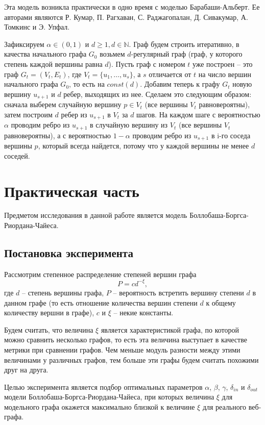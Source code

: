 \documentclass[14pt]{extreport}
\begin{document}
Эта модель возникла практически в одно время с моделью Барабаши-Альберт. Ее авторами являются Р. Кумар, П. Рагхаван, С. Раджагопалан, Д. Сивакумар, А. Томкинс и Э. Упфал.

Зафиксируем $\alpha \in (0,1)$ и $d \ge 1, d \in \mathbb{N}$. Граф будем строить итеративно, в качества начального графа $G_0$ возьмем $d$-регулярный граф (граф, у которого степень каждой вершины равна $d$). Пусть граф с номером $t$ уже построен -- это граф $G_t = (V_t, E_t)$, где $V_t = \{u_1, \dots, u_s\}$, а $s$ отличается от $t$ на число вершин начального графа $G_0$, то есть на $const(d)$. Добавим теперь к графу $G_t$ новую вершину $u_{s+1}$ и $d$ ребер, выходящих из нее. Сделаем это следующим образом: сначала выберем случайную вершину $p \in V_t$ (все вершины $V_t$ равновероятны), затем построим $d$ ребер из $u_{s+1}$ в $V_t$ за $d$ шагов. На каждом шаге с вероятностью $\alpha$ проводим ребро из $u_{s+1}$ в случайную вершину из $V_t$ (все вершины $V_t$ равновероятны), а с вероятностью $1-\alpha$ проводим ребро из $u_{s+1}$ в i-го соседа вершины $p$, который всегда найдется, потому что у каждой вершины не менее $d$ соседей. 

\chapter{Практическая часть}

Предметом исследования в данной работе является модель Боллобаша-Боргса-Риордана-Чайеса.

\section{Постановка эксперимента}

Рассмотрим степенное распределение степеней вершин графа
$$
P = c d^{-\xi},
$$
где $d$ -- степень вершины графа, $P$ -- вероятность встретить вершину степени $d$ в данном графе (то есть отношение количества вершин степени $d$ к общему количеству вершни в графе), $c$ и $\xi$ -- некие константы.

Будем считать, что величина $\xi$ является характеристикой графа, по которой можно сравнить несколько графов, то есть эта величина выступает в качестве метрики при сравнении графов. Чем меньше модуль разности между этими величинами у различных графов, тем больше эти графы будем считать похожими друг на друга.

Целью эксперимента является подбор оптимальных параметров $\alpha$, $\beta$, $\gamma$, $\delta_{in}$ и $\delta_{out}$ модели Боллобаша-Боргса-Риордана-Чайеса, при которых величина $\xi$ для модельного графа окажется максимально близкой к величине $\xi$ для реального веб-графа.
\end{document}
